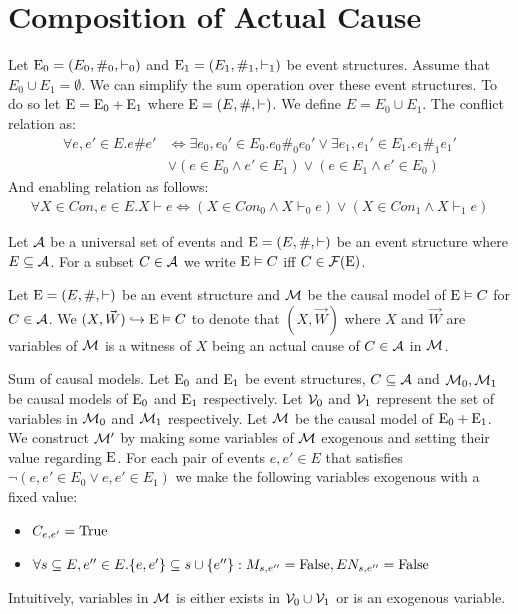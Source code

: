 \section{Composition of Actual Cause}
Let $\mathrm{E}_0 = (E_0,\#_0,\vdash_0)$ and
$\mathrm{E}_1 = (E_1,\#_1,\vdash_1)$ be event structures.
Assume that $E_0 \cup E_1 = \emptyset$.
We can simplify the sum operation over these event structures.
To do so let $ \mathrm{E} = \mathrm{E}_0 + \mathrm{E}_1$ where
$\mathrm{E} = (E,\#,\vdash)$.
We define $E = E_0 \cup E_1$.
The conflict relation as:
\begin{align*}
    \forall e,e' \in E. e \# e' & \iff
    \exists e_0,e_0' \in E_0. e_0 \#_0 e_0'
    \vee \exists e_1,e_1' \in E_1. e_1 \#_1 e_1'                                 \\
                                & \vee \left(e \in E_0 \wedge e' \in E_1 \right)
    \vee \left(e \in E_1 \wedge e' \in E_0 \right)
\end{align*}
And enabling relation as follows:
\begin{align*}
    \forall X \in Con, e \in E. X \vdash e \iff
    \left( X \in Con_0 \wedge X \vdash_0 e \right)
    \vee \left( X \in Con_1 \wedge X \vdash_1 e \right)
\end{align*}
\begin{notion}
    Let $\mathcal{A}$ be a universal set of events and $\mathrm{E} = (E,\#,\vdash)$
    be an event structure where $E \subseteq \mathcal{A}$.
    For a subset $C \in \mathcal{A}$ we write $\mathrm{E} \vDash C$ iff
    $C \in \mathcal{F}(\mathrm{E})$.
\end{notion}

\begin{notion}
    Let $\mathrm{E} = (E,\#,\vdash)$ be an event structure and
    $\mathcal{M}$ be the causal model of $ \mathrm{E} \vDash C$  for $C \in \mathcal{A}$.
    We $(X,\vec W) \hookrightarrow \mathrm{E} \vDash C$ to denote that
    $(X,\vec W)$ where $X$ and $\vec W$ are variables of $\mathcal{M}$
    is a witness of $X$ being an actual cause of $C \in \mathcal{A}$ in $\mathcal{M}$.
\end{notion}

\begin{definition}
    Sum of causal models. Let $\mathrm{E}_0$ and $\mathrm{E}_1$ be event structures,
    $C \subseteq \mathcal{A}$ and $\mathcal{M}_0,\mathcal{M}_1$ be causal models of
    $\mathrm{E}_0$ and $\mathrm{E}_1$ respectively.
    Let $\mathcal{V}_0$ and $\mathcal{V}_1$ represent the set of variables in
    $\mathcal{M}_0$ and $\mathcal{M}_1$ respectively.
    Let $\mathcal{M}$ be the causal model of $\mathrm{E}_0 + \mathrm{E}_1$.
    We construct $\mathcal{M}'$ by making some variables of $\mathcal{M}$ exogenous
    and setting their value regarding $\mathrm{E}$.
    For each pair of events $e,e' \in E$ that satisfies
    $\neg (e,e' \in E_0 \vee e,e' \in E_1)$ we make the following
    variables exogenous with a fixed value:
    \begin{itemize}
        \item $C_{e,e'} = \mathrm{True}$
        \item $\forall s \subseteq E, e'' \in E. \{e,e'\}
                  \subseteq s \cup \{e''\}: M_{s,e''} = \mathrm{False}, EN_{s,e''} = \mathrm{False} $
    \end{itemize}
    Intuitively, variables in $\mathcal{M}$ is either exists in
    $\mathcal{V}_0 \cup \mathcal{V}_1$ or is an exogenous variable.
\end{definition}

